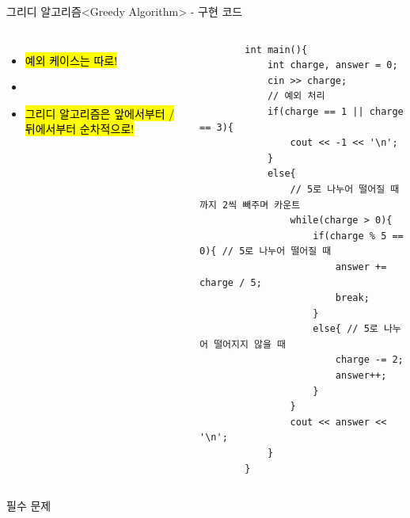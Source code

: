 \begin{frame}[fragile]{그리디 알고리즘}{<Greedy Algorithm> - 구현 코드}
  \begin{columns}[T]
      \vspace{2mm}
      \vspace{8mm}

      \begin{itemize}
        \item \hl{예외 케이스는 따로!}
        \item[] \vspace{1mm}
        \item \hl{그리디 알고리즘은 앞에서부터 / 뒤에서부터 순차적으로!}
      \end{itemize}
      \begin{verbatim}
        int main(){
            int charge, answer = 0;
            cin >> charge;
            // 예외 처리
            if(charge == 1 || charge == 3){
                cout << -1 << '\n';
            }
            else{
                // 5로 나누어 떨어질 때까지 2씩 빼주며 카운트
                while(charge > 0){
                    if(charge % 5 == 0){ // 5로 나누어 떨어질 때
                        answer += charge / 5;
                        break;
                    }
                    else{ // 5로 나누어 떨어지지 않을 때
                        charge -= 2;
                        answer++;
                    }
                }
                cout << answer << '\n';
            }
        }
      \end{verbatim}
  \end{columns}
\end{frame}


\begin{frame}{필수 문제}
  \begin{columns}[T]
  \end{columns}
\end{frame}

